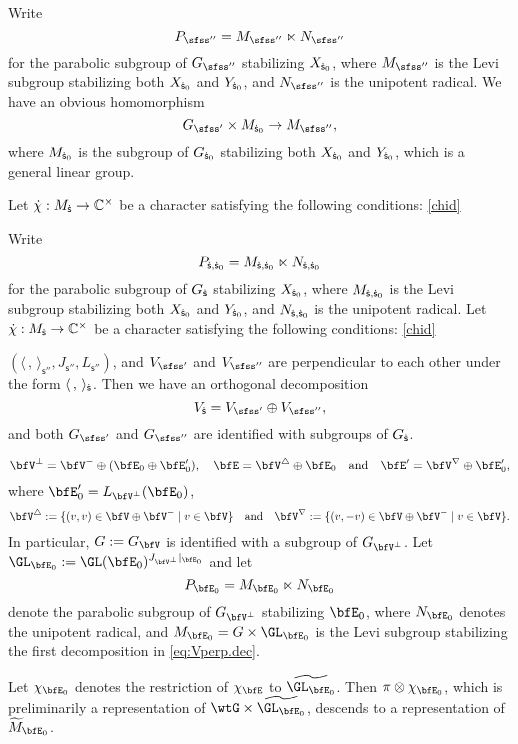 \documentclass[12pt,a4paper]{amsart}
\newcommand{\wtM}{\widetilde{M}}
\newcommand{\la}{\langle}
\newcommand{\ra}{\rangle}
\numberwithin{equation}{section}
\theoremstyle{remark}
\begin{document}
 Write
\[
  P_{\sfss''}=M_{\sfss''}\ltimes N_{\sfss''}
\]
for the parabolic subgroup of $G_{\sfss''}$ stabilizing $X_{{\dot{\mathsf s}}_0}$, where $M_{\sfss''}$ is the Levi subgroup stabilizing both $X_{{\dot{\mathsf s}}_0}$ and $Y_{{\dot{\mathsf s}}_0}$, and $N_{\sfss''}$ is the unipotent radical. We have an obvious homomorphism
\[
  G_{\sfss'}\times M_{\dsfss_0}\rightarrow M_{\sfss''}, 
\]
where $M_{{\dot{\mathsf s}}_0}$ is the subgroup of $G_{{\dot{\mathsf s}}_0}$ stabilizing both $X_{{\dot{\mathsf s}}_0}$ and $Y_{{\dot{\mathsf s}}_0}$, which is a general linear group. 

Let $\dot{\chi}: M_{{\dot{\mathsf s}}}\rightarrow \mathbb{C}^\times $ be a character satisfying the following conditions:
\eqref{chid}

Write
\[
  P_{{\dot{\mathsf s}},{\dot{\mathsf s}}_0}=M_{{\dot{\mathsf s}}, {\dot{\mathsf s}}_0}\ltimes N_{{\dot{\mathsf s}},{\dot{\mathsf s}}_0}
\]
for the parabolic subgroup of $G_{\dot{\mathsf s}}$ stabilizing $X_{{\dot{\mathsf s}}_0}$, where $M_{{\dot{\mathsf s}}, {\dot{\mathsf s}}_0}$ is the Levi subgroup stabilizing both $X_{{\dot{\mathsf s}}_0}$ and $Y_{{\dot{\mathsf s}}_0}$, and $N_{{\dot{\mathsf s}},{\dot{\mathsf s}}_0}$ is the unipotent radical. 
Let $\dot{\chi}: M_{{\dot{\mathsf s}}}\rightarrow \mathbb{C}^\times $ be a character satisfying the following conditions:
\eqref{chid}



 $(\la\,,\,\ra_{\mathsf s''}, J_{\mathsf s''}, L_{\mathsf s''})$, and $V_{\sfss'}$ and $V_{\sfss''}$ are perpendicular to each other under the form $\la\,,\,\ra_{\dsfss}$. Then we have an orthogonal decomposition 
\[
  V_\dsfss=V_{\sfss'}\oplus V_{\sfss''},
\]
and both $G_{\sfss'}$ and $G_{\sfss''}$ are identified with subgroups of $G_{{\dot{\mathsf s}}}$.


\begin{equation}
\label{eq:Vperp.dec}
  \bfV^\perp=\bfV^-\oplus (\bfE_0\oplus \bfE_0'), \quad  \bfE=\bfV^\triangle \oplus \bfE_0\quad \textrm{and}\quad \bfE'=\bfV^\nabla\oplus \bfE_0',
\end{equation}
where $\bfE_0'=L_{\bfV^\perp} (\bfE_0)$,
\[
\bfV^\triangle:=\{(v,v)\in \bfV\oplus \bfV^-\mid v\in \bfV\}\quad\textrm{and}\quad \bfV^\nabla:=\{(v,-v)\in \bfV\oplus \bfV^-\mid v\in \bfV\}.
\]
In particular, $G:=G_{\bfV}$ is identified with a subgroup of $G_{\bfV^\perp}$.
Let $\GLEz := \GL(\bfE_0)^{J_{\bfV^\perp}|_{\bfE_0}}$ and let
\[
  P_{\bfE_0}=M_{\bfE_0}\ltimes N_{\bfE_0}
\]
denote the parabolic subgroup of $G_{\bfV^\perp}$ stabilizing $\bfE_0$, where
$N_{\bfE_0}$ denotes the unipotent radical, and $M_{\bfE_0}=G\times
\GLEz$ is the Levi subgroup stabilizing the first decomposition
in \eqref{eq:Vperp.dec}.

Let $\chi_{\bfE_0}$ denotes the restriction of $\chi_{\bfE}$ to
$\wtGLEz$. Then $\pi\otimes \chi_{\bfE_0}$,
which is preliminarily a representation of $\wtG\times
\wtGLEz$, descends to a representation of
$\wtM_{\bfE_0}$.
\end{document}
